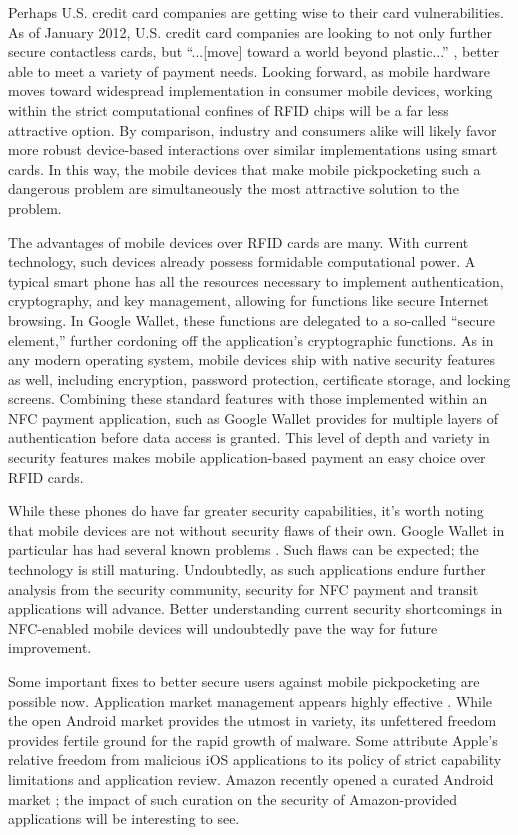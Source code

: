 \documentclass{IEEEtran}
\begin{document}
Perhaps U.S. credit card companies are getting wise to their card vulnerabilities.  As of January 2012, U.S. credit card companies are looking to not only further secure contactless cards, but ``...[move] toward a world beyond plastic...'' \cite{emv-upgrade}, better able to meet a variety of payment needs.  Looking forward, as mobile hardware moves toward widespread implementation in consumer mobile devices, working within the strict computational confines of RFID chips will be a far less attractive option. By comparison, industry and consumers alike will likely favor more robust device-based interactions over similar implementations using smart cards.  In this way, the mobile devices that make mobile pickpocketing such a dangerous problem are simultaneously the most attractive solution to the problem.     

The advantages of mobile devices over RFID cards are many.  With current technology, such devices already possess formidable computational power.  A typical smart phone has all the resources necessary to implement authentication, cryptography, and key management, allowing for functions like secure Internet browsing.  In Google Wallet, these functions are delegated to a so-called ``secure element,'' further cordoning off the application's cryptographic functions.  As in any modern operating system, mobile devices ship with native security features as well, including encryption, password protection, certificate storage, and locking screens.  Combining these standard features with those implemented within an NFC payment application, such as Google Wallet \cite{google-wallet-security-1} provides for multiple layers of authentication before data access is granted.  This level of depth and variety in security features makes mobile application-based payment an easy choice over RFID cards.  

While these phones do have far greater security capabilities, it's worth noting that mobile devices are not without security flaws of their own.  Google Wallet in particular has had several known problems \cite{google-wallet-pin-cracked} \cite{smartphonechamp-second-major-flaw-google-wallet}.  Such flaws can be expected; the technology is still maturing.  Undoubtedly, as such applications endure further analysis from the security community, security for NFC payment and transit applications will advance.  Better understanding current security shortcomings in NFC-enabled mobile devices will undoubtedly pave the way for future improvement.

Some important fixes to better secure users against mobile pickpocketing are possible now.  Application market management appears highly effective \cite{electronista-mcafee-malware-surge}.  While the open Android market provides the utmost in variety, its unfettered freedom provides fertile ground for the rapid growth of malware.  Some attribute Apple's relative freedom from malicious iOS applications to its policy of strict capability limitations and application review.  Amazon recently opened a curated Android market \cite{amazon-android-appstore}; the impact of such curation on the security of Amazon-provided applications will be interesting to see.  
\end{document}
